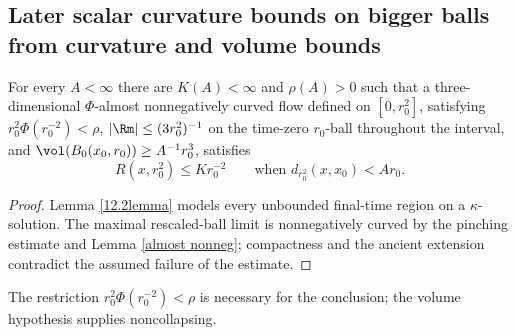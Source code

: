 \subsection{Later scalar curvature bounds on bigger balls from curvature and volume bounds}
\label{I.12.2}
\begin{theorem}
\label{thm:kl-later-scalar-curvature-bounds-bigger-balls-from-curvature-volume-bounds-positivity-scalar-curvature}

\label{thmI.12.2}
For every $A<\infty$ there are $K(A)<\infty$ and $\rho(A)>0$ such that a
three-dimensional $\Phi$-almost nonnegatively curved flow defined on
$[0,r_0^2]$, satisfying $r_0^2\Phi(r_0^{-2})<\rho$,
$|\Rm|\leq(3r_0^2)^{-1}$ on the time-zero $r_0$-ball throughout the interval,
and $\vol(B_0(x_0,r_0))\geq A^{-1}r_0^3$, satisfies
\[
R(x,r_0^2)\leq K r_0^{-2}\qquad\text{when }d_{r_0^2}(x,x_0)<Ar_0.
\]
\end{theorem}
\begin{proof}
\sketch Lemma \ref{12.2lemma} models every unbounded final-time region on a
$\kappa$-solution.  The maximal rescaled-ball limit is nonnegatively curved
by the pinching estimate and Lemma \ref{almost nonneg}; compactness and the
ancient extension contradict the assumed failure of the estimate.
\end{proof}
\begin{remark}
\label{rem:kl-later-scalar-curvature-bounds-bigger-balls-from-curvature-volume-bounds-existence-noncollapsing}

\label{rmkI.12.2}

The restriction $r_0^2\Phi(r_0^{-2})<\rho$ is necessary for the conclusion;
the volume hypothesis supplies noncollapsing.
\end{remark}
